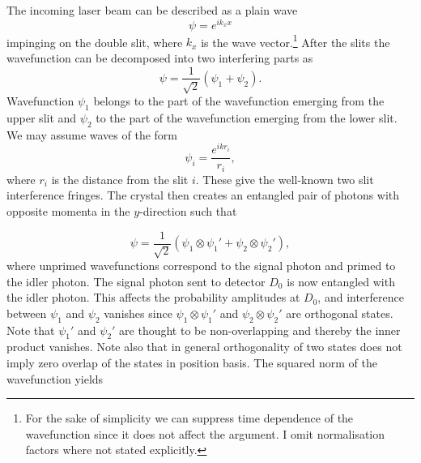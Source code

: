 \documentclass[11pt]{article}
\numberwithin{equation}{section}
\begin{document}
The incoming laser beam can be described as a plain wave 
\begin{equation}
\label{laser}
\psi=e^{ik_xx}
\end{equation} impinging on the double slit, where $k_x$ is the wave vector.\footnote{For the sake of simplicity we can suppress time dependence of the wavefunction since it does not affect the argument. I omit normalisation factors where not stated explicitly.} After the slits the wavefunction can be decomposed into two interfering parts as
\begin{equation}
\psi= \frac{1}{\sqrt{2}}(\psi_1+\psi_2).
\end{equation} Wavefunction $\psi_1$ belongs to the part of the wavefunction emerging from the upper slit and $\psi_2$ to the part of the wavefunction emerging from the lower slit. We may assume waves of the form
\begin{equation}
\psi_i=\frac{e^{ikr_i}}{r_i},
\end{equation} where $r_i$ is the distance from the slit $i$. 
These give the well-known two slit interference fringes. The crystal then creates an entangled pair of photons with opposite momenta in the $y$-direction such that 

\begin{equation}
\label{pair}
\psi=\frac{1}{\sqrt{2}}(\psi_1\otimes \psi_1'+\psi_2\otimes \psi_2'),
\end{equation} where unprimed wavefunctions correspond to the signal photon and primed to the idler photon. The signal photon sent to detector $D_0$ is now entangled with the idler photon. This affects the probability amplitudes at $D_0$, and interference between $\psi_1$ and $\psi_2$ vanishes since $\psi_1\otimes \psi_1'$ and  $\psi_2\otimes \psi_2'$ are orthogonal states. Note that $\psi_1'$ and $\psi_2'$ are thought to be non-overlapping and thereby the inner product vanishes. Note also that in general orthogonality of two states does not imply zero overlap of the states in position basis. The squared norm of the wavefunction yields
\end{document}
